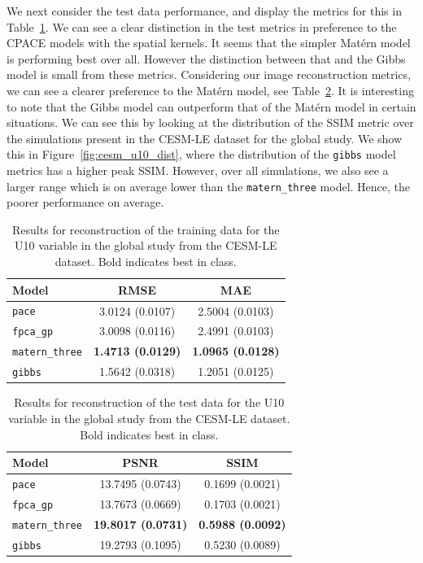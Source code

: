 We next consider the test data performance, and display the metrics for this in Table~\ref{tab:test_cesm_u10_globe}.
We can see a clear distinction in the test metrics in preference to the CPACE models with the spatial kernels.
It seems that the simpler Mat\'ern model is performing best over all.
However the distinction between that and the Gibbs model is small from these metrics.
Considering our image reconstruction metrics, we can see a clearer preference to the Mat\'ern model, see Table~\ref{tab:full_cesm_u10_globe}. 
It is interesting to note that the Gibbs model can outperform that of the Mat\'ern model in certain situations.
We can see this by looking at the distribution of the SSIM metric over the simulations present in the CESM-LE dataset for the global study.
We show this in Figure~\ref{fig:cesm_u10_dist}, where the distribution of the \verb*|gibbs| model metrics has a higher peak SSIM. 
However, over all simulations, we also see a larger range which is on average lower than the \verb*|matern_three| model. 
Hence, the poorer performance on average.


\begin{table}
	\caption[Results for U10 variable on test data in the Global study]{Results for reconstruction of the training data for the U10 variable in the global study from the CESM-LE dataset. Bold indicates best in class.}
	\centering
	\label{tab:test_cesm_u10_globe}
	\begin{tabular}{lcc}
		\toprule
		\textbf{Model} & \textbf{RMSE} & \textbf{MAE} \\
		\midrule
		\verb*|pace| & 3.0124 (0.0107) & 2.5004	(0.0103) \\
		\verb*|fpca_gp| & 3.0098 (0.0116) & 2.4991 (0.0103) \\
		\verb*|matern_three| & \textbf{1.4713 (0.0129)}& \textbf{1.0965	(0.0128)}\\
		\verb*|gibbs| & 1.5642	(0.0318) & 1.2051	(0.0125)\\
		\bottomrule
	\end{tabular}
\end{table}

\begin{table}
	\caption[Results for U10 variable on training data in the Global study]{Results for reconstruction of the test data for the U10 variable in the global study from the CESM-LE dataset. Bold indicates best in class.}
	\centering
	\label{tab:full_cesm_u10_globe}
	\begin{tabular}{lcc}
		\toprule
		\textbf{Model} & \textbf{PSNR} & \textbf{SSIM} \\
		\midrule
		\verb*|pace| & 13.7495	(0.0743) & 0.1699 (0.0021) \\
		\verb*|fpca_gp| & 13.7673 (0.0669)& 0.1703 (0.0021) \\
		\verb*|matern_three| & \textbf{19.8017 (0.0731)}& \textbf{0.5988 (0.0092)}\\
		\verb*|gibbs| & 19.2793	(0.1095) & 0.5230 (0.0089)\\
		\bottomrule
	\end{tabular}
\end{table}

